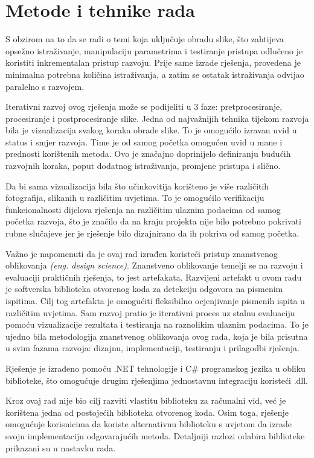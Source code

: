 \documentclass{foi}
\begin{document}
\chapter{Metode i tehnike rada}

S obzirom na to da se radi o temi koja uključuje obradu slike, što zahtijeva opsežno istraživanje, manipulaciju parametrima i testiranje pristupa odlučeno je koristiti inkrementalan pristup razvoju. Prije same izrade rješenja, provedena je minimalna potrebna količina istraživanja, a zatim se ostatak istraživanja odvijao paralelno s razvojem.

Iterativni razvoj ovog rješenja može se podijeliti u 3 faze: pretprocesiranje, procesiranje i postprocesiranje slike. Jedna od najvažnijih tehnika tijekom razvoja bila je  vizualizacija svakog koraka obrade slike. To je omogućilo izravan uvid u status i smjer razvoja. Time je od samog početka omogućen uvid u mane i prednosti korištenih metoda. Ovo je značajno doprinijelo definiranju budućih razvojnih koraka, poput  dodatnog istraživanja, promjene pristupa i slično. 

Da bi sama vizualizacija bila što učinkovitija korišteno je više različitih fotografija, slikanih u različitim uvjetima. To je omogućilo verifikaciju funkcionalnosti dijelova rješenja na različitim ulaznim podacima od samog početka razvoja, što je značilo da na kraju projekta nije bilo potrebno pokrivati rubne slučajeve jer je rješenje bilo dizajnirano da ih pokriva od samog početka.

Važno je napomenuti da je ovaj rad izrađen koristeći pristup znanstvenog oblikovanja \textit{(eng. design science)}. Znanstveno oblikovanje temelji se na razvoju i evaluaciji praktičnih rješenja, to jest artefakata. Razvijeni artefakt u ovom radu je softverska biblioteka otvorenog koda za detekciju odgovora na pismenim ispitima. Cilj tog artefakta je omogućiti fleksibilno ocjenjivanje pismenih ispita u različitim uvjetima. Sam razvoj pratio je iterativni proces uz stalnu evaluaciju pomoću vizualizacije rezultata i testiranja na raznolikim ulaznim podacima. To je ujedno bila metodologija znanstvenog oblikovanja ovog rada, koja je bila prisutna u svim fazama razvoja: dizajnu, implementaciji, testiranju i prilagodbi rješenja.

Rješenje je izrađeno pomoću .NET tehnologije i C\# programskog jezika u obliku biblioteke, što omogućuje drugim rješenjima jednostavnu integraciju koristeći .dll. 

Kroz ovaj rad nije bio cilj razviti vlastitu biblioteku za računalni vid, već je korištena jedna od postojećih biblioteka otvorenog koda. Osim toga, rješenje omogućuje korisnicima da koriste alternativnu biblioteku s uvjetom da izrade svoju implementaciju odgovarajućih metoda. Detaljniji razlozi odabira biblioteke prikazani su u nastavku rada.
\end{document}
